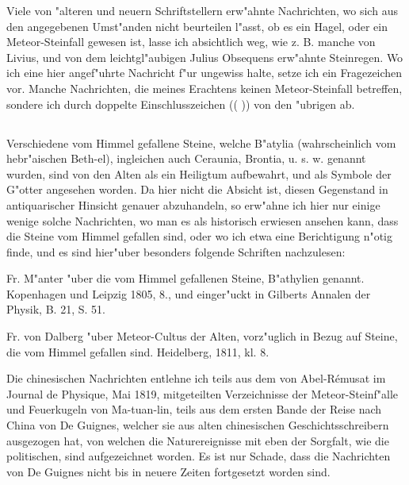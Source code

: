 \documentclass[a4paper, 11pt, oneside, polutonikogreek, german]{article}
\begin{document}
Viele von "alteren und neuern Schriftstellern erw"ahnte Nachrichten, wo sich aus den angegebenen Umst"anden nicht beurteilen l"asst, ob es ein Hagel, oder ein Meteor-Steinfall gewesen ist, lasse ich absichtlich weg, wie z. B. manche von Livius, und von dem leichtgl"aubigen Julius Obsequens erw"ahnte Steinregen. Wo ich eine hier angef"uhrte Nachricht f"ur ungewiss halte, setze ich ein Fragezeichen vor. Manche Nachrichten, die meines Erachtens keinen Meteor-Steinfall betreffen, sondere ich durch doppelte Einschlusszeichen (( )) von den "ubrigen ab.
\subsection{}
\paragraph{}
Verschiedene vom Himmel gefallene Steine, welche B"atylia (wahrscheinlich vom hebr"aischen Beth-el), ingleichen auch Ceraunia, Brontia, u. s. w. genannt wurden, sind von den Alten als ein Heiligtum aufbewahrt, und als Symbole der G"otter angesehen worden. Da hier nicht die Absicht ist, diesen Gegenstand in antiquarischer Hinsicht genauer abzuhandeln, so erw"ahne ich hier nur einige wenige solche Nachrichten, wo man es als historisch erwiesen ansehen kann, dass die Steine vom Himmel gefallen sind, oder wo ich etwa eine Berichtigung n"otig finde, und es sind hier"uber besonders folgende Schriften nachzulesen:

Fr. M"anter "uber die vom Himmel gefallenen Steine, B"athylien genannt. Kopenhagen und Leipzig 1805, 8., und einger"uckt in Gilberts Annalen der Physik, B. 21, S. 51.

Fr. von Dalberg "uber Meteor-Cultus der Alten, vorz"uglich in Bezug auf Steine, die vom Himmel gefallen sind. Heidelberg, 1811, kl. 8.

Die chinesischen Nachrichten entlehne ich teils aus dem von Abel-Rémusat im Journal de Physique, Mai 1819, mitgeteilten Verzeichnisse der Meteor-Steinf"alle und Feuerkugeln von Ma-tuan-lin, teils aus dem ersten Bande der Reise nach China von De Guignes, welcher sie aus alten chinesischen Geschichtsschreibern ausgezogen hat, von welchen die Naturereignisse mit eben der Sorgfalt, wie die politischen, sind aufgezeichnet worden. Es ist nur Schade, dass die Nachrichten von De Guignes nicht bis in neuere Zeiten fortgesetzt worden sind.
\end{document}
